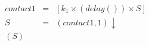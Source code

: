 
\begin{eqnarray*}
\mathit{contact1} & = & [k_1\times (\mathit{delay}())\times S]\\
%

%
S & = & (\mathit{contact1},1){\downarrow}\\
%

%
(S)\end{eqnarray*}
